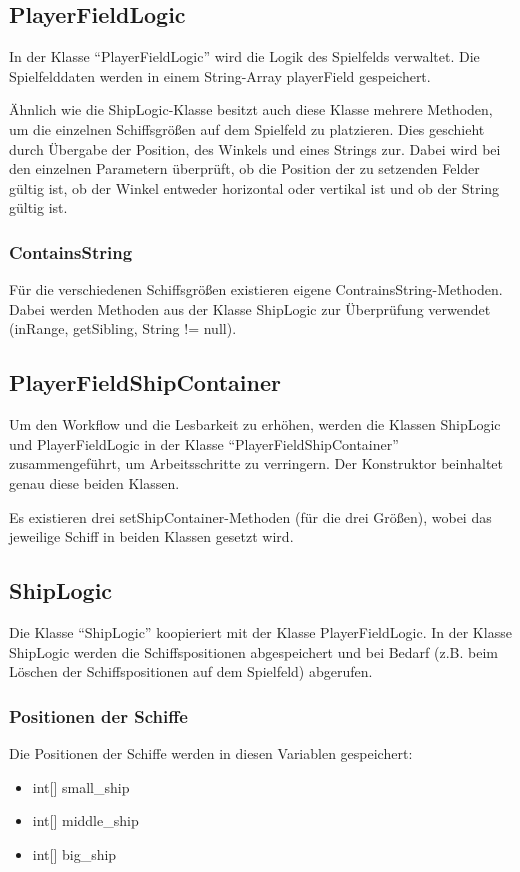 \documentclass[11pt]{article} %
\begin{document}
\subsection{PlayerFieldLogic}
In der Klasse \enquote{PlayerFieldLogic} wird die Logik des Spielfelds verwaltet. Die Spielfelddaten werden in einem String-Array playerField gespeichert.

Ähnlich wie die ShipLogic-Klasse besitzt auch diese Klasse mehrere Methoden, um die einzelnen Schiffsgrößen auf dem Spielfeld zu platzieren. Dies geschieht durch Übergabe der Position, des Winkels und eines Strings zur. Dabei wird bei den einzelnen Parametern überprüft, ob die Position der zu setzenden Felder gültig ist, ob der Winkel entweder horizontal oder vertikal ist und ob der String gültig ist.

\subsubsection{ContainsString}
Für die verschiedenen Schiffsgrößen existieren eigene ContrainsString-Methoden. Dabei werden Methoden aus der Klasse ShipLogic zur Überprüfung verwendet (inRange, getSibling, String != null).

\subsection{PlayerFieldShipContainer}
Um den Workflow und die Lesbarkeit zu erhöhen, werden die Klassen ShipLogic und PlayerFieldLogic in der Klasse \enquote{PlayerFieldShipContainer} zusammengeführt, um Arbeitsschritte zu verringern. Der Konstruktor beinhaltet genau diese beiden Klassen.

Es existieren drei setShipContainer-Methoden (für die drei Größen), wobei das jeweilige Schiff in beiden Klassen gesetzt wird.

\subsection{ShipLogic}
Die Klasse \enquote{ShipLogic} koopieriert mit der Klasse PlayerFieldLogic. In der Klasse ShipLogic werden die Schiffspositionen abgespeichert und bei Bedarf (z.B. beim Löschen der Schiffspositionen auf dem Spielfeld) abgerufen.

\subsubsection{Positionen der Schiffe}
Die Positionen der Schiffe werden in diesen Variablen gespeichert:
\begin{itemize}
\item int[] small\_ship
\item int[] middle\_ship
\item int[] big\_ship
\end{itemize}
\end{document}
